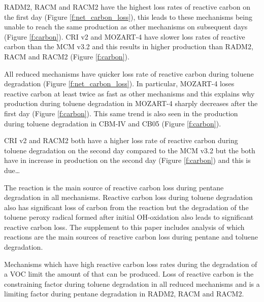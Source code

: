 RADM2, RACM and RACM2 have the highest loss rates of reactive carbon on the first day (Figure \ref{f:net_carbon_loss}), this leads to these mechanisms being unable to reach the same  production as other mechanisms on subsequent days (Figure \ref{f:carbon}).
CRI v2 and MOZART-4 have slower loss rates of reactive carbon than the MCM v3.2 and this results in higher  production than RADM2, RACM and RACM2 (Figure \ref{f:carbon}).

All reduced mechanisms have quicker loss rate of reactive carbon during toluene degradation (Figure \ref{f:net_carbon_loss}).
In particular, MOZART-4 loses reactive carbon at least twice as fast as other mechanisms and this explains why  production during toluene degradation in MOZART-4 sharply decreases after the first day (Figure \ref{f:carbon}).
This same trend is also seen in the  production during toluene degradation in CBM-IV and CB05 (Figure \ref{f:carbon}).

CRI v2 and RACM2 both have a higher loss rate of reactive carbon during toluene degradation on the second day compared to the MCM v3.2 but the both have in increase in  production on the second day (Figure \ref{f:carbon}) and this is due\ldots

The  reaction is the main source of reactive carbon loss during pentane degradation in all mechanisms.
Reactive carbon loss during toluene degradation also has significant loss of carbon from the  reaction but the degradation of the toluene peroxy radical formed after initial OH-oxidation also leads to significant reactive carbon loss.
The supplement to this paper includes analysis of which reactions are the main sources of reactive carbon loss during pentane and toluene degradation.

Mechanisms which have high reactive carbon loss rates during the degradation of a VOC limit the amount of  that can be produced.
Loss of reactive carbon is the constraining factor during toluene degradation in all reduced mechanisms and is a limiting factor during pentane degradation in RADM2, RACM and RACM2.
